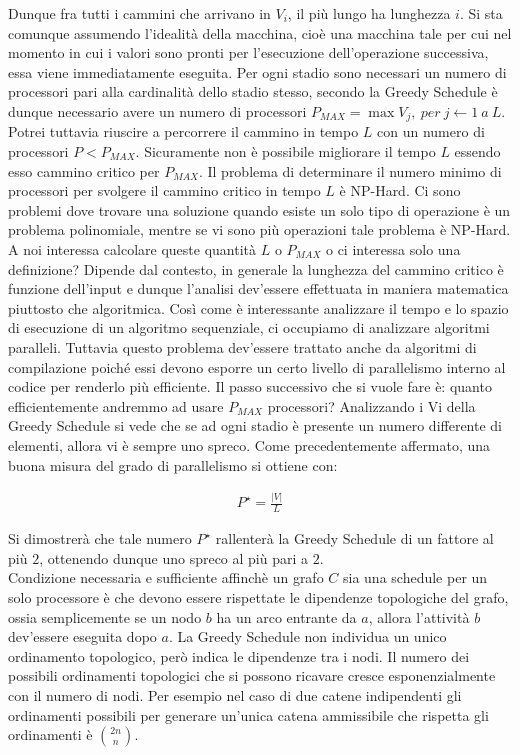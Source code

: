 \documentclass[a4paper,portrait,12pt]{article}
\theoremstyle{definition}
\providecommand{\abs}[1]{\lvert#1\rvert}
\begin{document}
Dunque fra tutti i cammini che arrivano in $V_i$, il più lungo ha lunghezza $i$.
Si sta comunque assumendo l’idealità della macchina, cioè una macchina tale per cui nel momento in cui i valori sono pronti per l’esecuzione dell’operazione successiva, essa viene immediatamente eseguita.
Per ogni stadio sono necessari un numero di processori pari alla cardinalità dello stadio stesso, secondo la Greedy Schedule è dunque necessario avere un numero di processori $P_{MAX} = \max{V_j,\ per\ j \leftarrow 1\ a\ L}$.
Potrei tuttavia riuscire a percorrere il cammino in tempo $L$ con un numero di processori $P < P_{MAX}$.
Sicuramente non è possibile migliorare il tempo $L$ essendo esso cammino critico per $P_{MAX}$.
Il problema di determinare il numero minimo di processori per svolgere il cammino critico in tempo $L$ è NP-Hard.
Ci sono problemi dove trovare una soluzione quando esiste un solo tipo di operazione è un problema polinomiale, mentre se vi sono più operazioni tale problema è NP-Hard.
A noi interessa calcolare queste quantità $L$ o $P_{MAX}$ o ci interessa solo una definizione?
Dipende dal contesto, in generale la lunghezza del cammino critico è funzione dell’input e dunque l’analisi dev’essere effettuata in maniera matematica piuttosto che algoritmica.
Così come è interessante analizzare il tempo e lo spazio di esecuzione di un algoritmo sequenziale, ci occupiamo di analizzare algoritmi paralleli.
Tuttavia questo problema dev’essere trattato anche da algoritmi di compilazione poiché essi devono esporre un certo livello di parallelismo interno al codice per renderlo più efficiente.
Il passo successivo che si vuole fare è: quanto efficientemente andremmo ad usare $P_{MAX}$ processori?
Analizzando i Vi della Greedy Schedule si vede che se ad ogni stadio è presente un numero differente di elementi, allora vi è sempre uno spreco.
Come precedentemente affermato, una buona misura del grado di parallelismo si ottiene con:

\begin{align*}
P^{\star} = \frac{\abs{V}}{L}
\end{align*}

Si dimostrerà che tale numero $P^{\star}$ rallenterà la Greedy Schedule di un fattore al più $2$, ottenendo dunque uno spreco al più pari a $2$.\\

Condizione necessaria e sufficiente affinchè un grafo $C$ sia una schedule per un solo processore è che devono essere rispettate le dipendenze topologiche del grafo, ossia semplicemente se un nodo $b$ ha un arco entrante da $a$, allora l’attività $b$ dev’essere eseguita dopo $a$.
La Greedy Schedule non individua un unico ordinamento topologico, però indica le dipendenze tra i nodi.
Il numero dei possibili ordinamenti topologici che si possono ricavare cresce esponenzialmente con il numero di nodi.
Per esempio nel caso di due catene indipendenti gli ordinamenti possibili per generare un’unica catena ammissibile che rispetta gli ordinamenti è $\binom{2n}{n}$.
\end{document}
